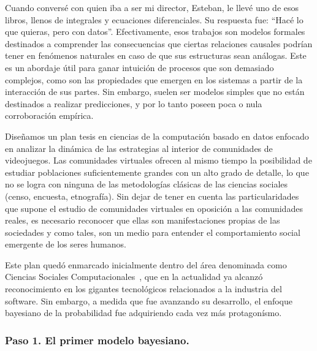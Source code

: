 \documentclass[a4paper,11pt]{book}
\theoremstyle{definition}
\begin{document}

Cuando convers\'e con quien iba a ser mi director, Esteban, le llev\'e uno de esos libros, llenos de integrales y ecuaciones diferenciales.
%
Su respuesta fue: ``Hac\'e lo que quieras, pero con datos''.
%
Efectivamente, esos trabajos son modelos formales destinados a comprender las consecuencias que ciertas relaciones causales podr\'ian tener en fen\'omenos naturales en caso de que sus estructuras sean an\'alogas.
%
Este es un abordaje \'util para ganar intuici\'on de procesos que son demasiado complejos, como son las propiedades que emergen en los sistemas a partir de la interacci\'on de sus partes.
%
Sin embargo, suelen ser modelos simples que no est\'an destinados a realizar predicciones, y por lo tanto poseen poca o nula corroboraci\'on emp\'irica.


Dise\~namos un plan tesis en ciencias de la computaci\'on basado en datos enfocado en analizar la din\'amica de las estrategias al interior de comunidades de videojuegos.
%
Las comunidades virtuales ofrecen al mismo tiempo la posibilidad de estudiar poblaciones suficientemente grandes con un alto grado de detalle, lo que no se logra con ninguna de las metodolog\'ias cl\'asicas de las ciencias sociales (censo, encuesta, etnograf\'ia).
%
Sin dejar de tener en cuenta las particularidades que supone el estudio de comunidades virtuales en oposici\'on a las comunidades reales, es necesario reconocer que ellas son manifestaciones propias de las sociedades y como tales, son un medio para entender el comportamiento social emergente de los seres humanos.


Este plan qued\'o enmarcado inicialmente dentro del \'area denominada como Ciencias Sociales Computacionales~\cite{Lazer2009, Lazer2020}, que en la actualidad ya alcanz\'o reconocimiento en los gigantes tecnol\'ogicos relacionados a la industria del software.
%
Sin embargo, a medida que fue avanzando su desarrollo, el enfoque bayesiano de la probabilidad fue adquiriendo cada vez m\'as protagon\'ismo.


\subsubsection{Paso 1. El primer modelo bayesiano.}
\end{document}
